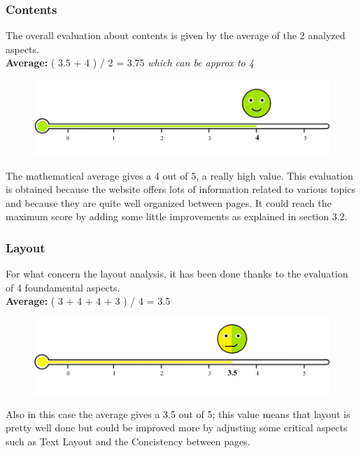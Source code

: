 \subsubsection*{Contents}
The overall evaluation about contents is given by the average of the 2 analyzed aspects.\\
\textbf{Average: } ( 3.5 + 4 ) / 2 = 3.75  \emph{which can be approx to 4}\\
\begin{figure}[h!]
	\centering
	\begin{minipage}[b]{1\textwidth}
    		\includegraphics[width=1\textwidth]{./assets/contents-value.png}
	\end{minipage}
\end{figure}
\FloatBarrier 
The mathematical average gives a 4 out of 5, a really high value. This evaluation is obtained because the website offers lots of information related to various topics and because they are quite well organized between pages. It could reach the maximum score by adding some little improvements as explained in section 3.2.

\clearpage

\subsubsection*{Layout}
For what concern the layout analysis, it has been done thanks to the evaluation of 4 foundamental aspects.\\
\textbf{Average: } ( 3 + 4 + 4 + 3 ) / 4 = 3.5 \\
\begin{figure}[h!]
	\centering
	\begin{minipage}[b]{1\textwidth}
    		\includegraphics[width=1\textwidth]{./assets/layout-navigation-value.png}
	\end{minipage}
\end{figure}
\FloatBarrier Also in this case the average gives a 3.5 out of 5; this value means that layout is pretty well done but could be improved more by adjusting some critical aspects such as Text Layout and the Concistency between pages.